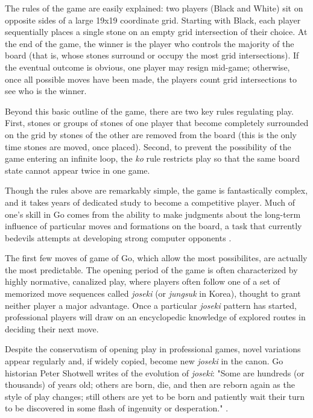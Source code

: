 \documentclass[reqno,12pt]{amsart}
\begin{document}
The rules of the game are easily explained: two players (Black and White) sit on opposite sides of a large 19x19 coordinate grid. Starting with Black, each player sequentially places a single stone on an empty grid intersection of their choice. At the end of the game, the winner is the player who controls the majority of the board (that is, whose stones surround or occupy the most grid intersections). If the eventual outcome is obvious, one player may resign mid-game; otherwise, once all possible moves have been made, the players count grid intersections to see who is the winner.

Beyond this basic outline of the game, there are two key rules regulating play. First, stones or groups of stones of one player that become completely surrounded on the grid by stones of the other are removed from the board (this is the only time stones are moved, once placed). Second, to prevent the possibility of the game entering an infinite loop, the \textit{ko} rule restricts play so that the same board state cannot appear twice in one game.

Though the rules above are remarkably simple, the game is fantastically complex, and it takes years of dedicated study to become a competitive player. Much of one's skill in Go comes from the ability to make judgments about the long-term influence of particular moves and formations on the board, a task that currently bedevils attempts at developing strong computer opponents \citep{rimmel2010current}.

The first few moves of game of Go, which allow the most possibilites, are actually the most predictable. The opening period of the game is often characterized by highly normative, canalized play, where players often follow one of a set of memorized move sequences called \textit{joseki} (or \textit{jungsuk} in Korea), thought to grant neither player a major advantage. Once a particular \textit{joseki} pattern has started, professional players will draw on an encyclopedic knowledge of explored routes in deciding their next move.

Despite the conservatism of opening play in professional games, novel variations appear regularly and, if widely copied, become new \textit{joseki} in the canon. Go historian Peter Shotwell writes of the evolution of \textit{joseki}: "Some are hundreds (or thousands) of years old; others are born, die, and then are reborn again as the style of play changes; still others are yet to be born and patiently wait their turn to be discovered in some flash of ingenuity or desperation." \citep{shotwell2011go}.
\end{document}
